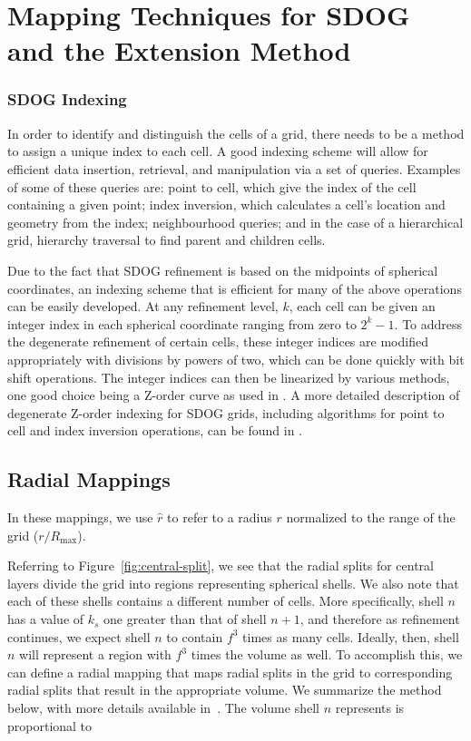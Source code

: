 \chapter{Mapping Techniques for SDOG and the Extension Method} \label{chap:mapping}





\subsection{SDOG Indexing} \label{sec:sdog-indexing}
In order to identify and distinguish the cells of a grid, there needs to be a method to assign a unique index to each cell.
A good indexing scheme will allow for efficient data insertion, retrieval, and manipulation via a set of queries.
Examples of some of these queries are: point to cell, which give the index of the cell containing a given point; index inversion, which calculates a cell's location and geometry from the index; neighbourhood queries; and in the case of a hierarchical grid, hierarchy traversal to find parent and children cells.


Due to the fact that SDOG refinement is based on the midpoints of spherical coordinates, an indexing scheme that is efficient for many of the above operations can be easily developed.
At any refinement level, $k$, each cell can be given an integer index in each spherical coordinate ranging from zero to $2^{k} - 1$.
To address the degenerate refinement of certain cells, these integer indices are modified appropriately with divisions by powers of two, which can be done quickly with bit shift operations.
The integer indices can then be linearized by various methods, one good choice being a Z-order curve \cite{morton1966computer} as used in \cite{yu2009sdog}.
A more detailed description of degenerate Z-order indexing for SDOG grids, including algorithms for point to cell and index inversion operations, can be found in \cite{yu2009coding}.


\section{Radial Mappings}
In these mappings, we use $\hat{r}$ to refer to a radius $r$ normalized to the range of the grid ($r/R_\mathrm{max}$).

Referring to Figure~\ref{fig:central-split}, we see that the radial splits for central layers divide the grid into regions representing spherical shells.
We also note that each of these shells contains a different number of cells.
More specifically, shell $n$ has a value of $k_s$ one greater than that of shell $n+1$, and therefore as refinement continues, we expect shell $n$ to contain $f^3$ times as many cells.
Ideally, then, shell $n$ will represent a region with $f^3$ times the volume as well.
To accomplish this, we can define a radial mapping that maps radial splits in the grid to corresponding radial splits that result in the appropriate volume.
We summarize the method below, with more details available in~\cite{ulmertoward2020}.
The volume shell $n$ represents is proportional to


